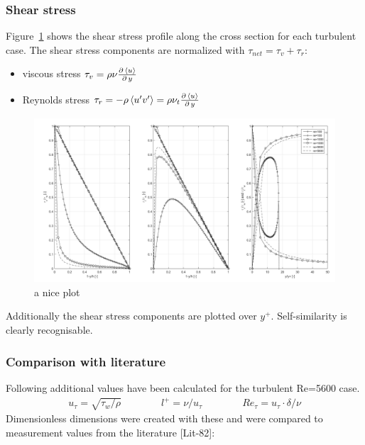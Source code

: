 \documentclass[11pt,a4paper]{article}
\begin{document}
\subsubsection{Shear stress}

Figure~\ref{fig:taus} shows the shear stress profile along the cross section for each turbulent case. The shear stress components are normalized with $\tau_{net}=\tau_v+\tau_r$:

\begin{itemize}
\item viscous stress $\tau_v=\rho\nu\frac{\partial \, \left\langle u\right\rangle}{\partial \, y}$
\item Reynolds stress $\tau_r=-\rho\left\langle u' v'\right\rangle=\rho\nu_t\frac{\partial \, \left\langle u\right\rangle}{\partial \, y}$
\end{itemize}

\begin{figure}[h]
    \centering
    \includegraphics[width=1.0\textwidth]{tau}
    \caption{a nice plot}
    \label{fig:taus}
\end{figure}

\noindent Additionally the shear stress components are plotted over $y^+$. Self-similarity is clearly recognisable.

\subsubsection{Comparison with literature}\label{sec:lit}
Following additional values have been calculated for the turbulent Re=5600 case.
\begin{align}
u_\tau=\sqrt{\tau_w/\rho}
\qquad\qquad
l^+=\nu/u_\tau
\qquad\qquad
Re_\tau=u_\tau\cdot\delta/\nu
\end{align}
Dimensionless dimensions were created with these and were compared to measurement values from the literature [Lit-82]:
\end{document}

